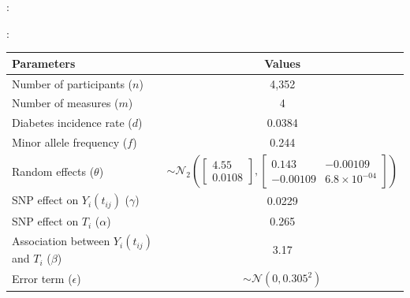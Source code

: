 \documentclass[10pt,  xcolors={RGB}, hyperref={%
    pdfpagelabels=false,
    colorlinks=true,
    pdftex=true,
    bookmarks=true,
    bookmarksopen=true,
    hyperfootnotes=true}]{beamer}
\begin{document}
\begin{frame}{\subsecname: \subsubsecname}
\begin{minipage}[c]{0.475\columnwidth}
\begin{center}
        \end{center}
    \end{minipage}
\end{frame}


\begin{frame}{\subsecname: \subsubsecname}
    \everymath{\color{black}}
    \begin{center}
        \begin{table}
            {\small
                \begin{tabular}{lc}
                    \hline
                    Parameters & Values\\
                    \hline
                    Number of participants ($n$) & 4,352\\
                    Number of measures ($m$) & 4\\
                    Diabetes incidence rate ($d$) & 0.0384\\
                    Minor allele frequency ($f$) & 0.244\\
                    Random effects ($\theta$) & $\sim\mathcal{N}_2\left (\begin{bmatrix}4.55\\0.0108\end{bmatrix} , \begin{bmatrix} 0.143 & -0.00109 \\ -0.00109 & 6.8\times 10^{-04} \end{bmatrix} \right )$\\
                    SNP effect on $Y_{i}(t_{ij})$ ($\gamma$) & 0.0229\\
                    SNP effect on $T_i$ ($\alpha$) & 0.265\\
                    Association between $Y_{i}(t_{ij})$ and $T_i$ ($\beta$) & 3.17\\
                    Error term ($\epsilon$) & $\sim\mathcal{N}(0,0.305^2)$\\
                    \hline
                \end{tabular}
            }
        \end{table}
    \end{center}
    \everymath{\color{dodgerblue}}
\end{frame}
\end{document}

